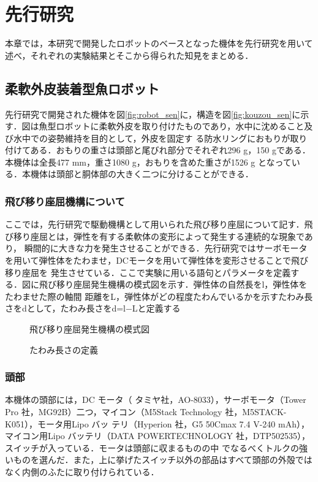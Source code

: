 \newpage
\section{先行研究}
本章では，本研究で開発したロボットのベースとなった機体を先行研究を用いて述べ，それぞれの実験結果とそこから得られた知見をまとめる．

\subsection{柔軟外皮装着型魚ロボット}
先行研究で開発された機体を図\ref{fig:robot_sen}に，構造を図\ref{fig:kouzou_sen}に示す．図は魚型ロボットに柔軟外皮を取り付けたものであり，水中に沈めること及び水中での姿勢維持を目的として，外皮を固定す
る防水リングにおもりが取り付けてある．おもりの重さは頭部と尾びれ部分でそれぞれ296 g，150 gである．本機体は全長477 mm，重さ1080 g，おもりを含めた重さが1526 g
となっている．本機体は頭部と胴体部の大きく二つに分けることができる．

\subsubsection{飛び移り座屈機構について}
ここでは，先行研究で駆動機構として用いられた飛び移り座屈について記す．飛び移り座屈とは，弾性を有する柔軟体の変形によって発生する連続的な現象であり，
瞬間的に大きな力を発生させることができる．先行研究ではサーボモータを用いて弾性体をたわませ，DCモータを用いて弾性体を変形させることで飛び移り座屈を
発生させている．ここで実験に用いる語句とパラメータを定義する．図に飛び移り座屈発生機構の模式図を示す．弾性体の自然長をl，弾性体をたわませた際の軸間
距離をL，弾性体がどの程度たわんでいるかを示すたわみ長さをdとして，たわみ長さをd=l−Lと定義する

\begin{figure}[b]
    \centering
     \begin{minipage}[b]{0.45\linewidth}
        \centering
        \caption{飛び移り座屈発生機構の模式図}
        \label{fig:zakutu1_sen}
     \end{minipage}
     \hspace{0.05\linewidth}
     \begin{minipage}[b]{0.45\linewidth}
        \centering
        \caption{たわみ長さの定義}
        \label{fig:zakutu2_sen}
     \end{minipage}
\end{figure}

\subsubsection{頭部}
本機体の頭部には，DC モータ（ タミヤ社，AO-8033），サーボモータ（Tower Pro 社，MG92B）二つ，マイコン（M5Stack Technology 社，M5STACK-K051），モータ用Lipo バッ
テリ（Hyperion 社，G5 50Cmax 7.4 V-240 mAh），マイコン用Lipo バッテリ（DATA POWERTECHNOLOGY 社，DTP502535），スイッチが入っている．モータは頭部に収まるものの中
でなるべくトルクの強いものを選んだ．また，上に挙げたスイッチ以外の部品はすべて頭部の外殻ではなく内側のふたに取り付けられている．

